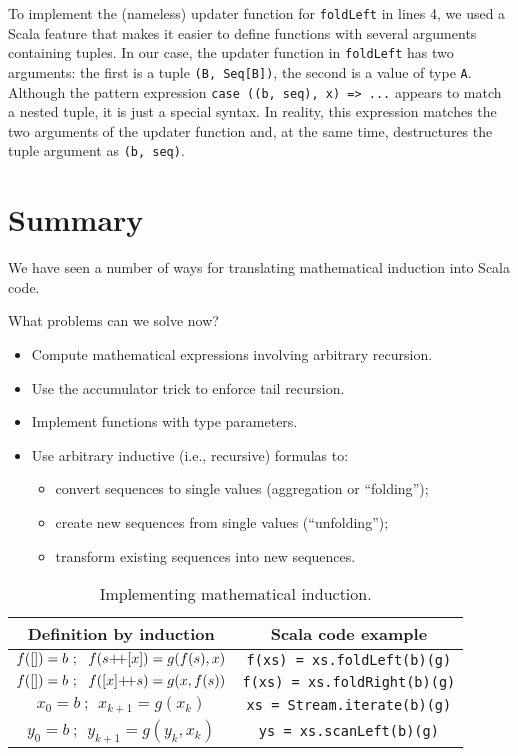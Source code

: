 \noindent To implement the (nameless) updater function for \lstinline!foldLeft!
in lines 4, we used a Scala feature that makes it easier
to define functions with several arguments containing tuples. In our
case, the updater function in \lstinline!foldLeft! has two arguments:
the first is a tuple \lstinline!(B, Seq[B])!, the second is a value
of type \lstinline!A!. Although the pattern expression \lstinline!case ((b, seq), x) => ...!
appears to match a nested tuple,
it is just a special syntax. In reality, this expression matches the
two arguments of the updater function and, at the same time, destructures
the tuple argument as \lstinline!(b, seq)!. 

\section{Summary}

We have seen a number of ways for translating mathematical induction
into Scala code.

What problems can we solve now?
\begin{itemize}
\item Compute mathematical expressions involving arbitrary recursion.
\item Use the accumulator trick to enforce tail recursion.
\item Implement functions with type parameters.
\item Use arbitrary inductive (i.e., recursive) formulas to:
\begin{itemize}
\item convert sequences to single values (aggregation or \textsf{``}folding\textsf{''});
\item create new sequences from single values (\textsf{``}unfolding\textsf{''});
\item transform existing sequences into new sequences.
\end{itemize}
\end{itemize}
\begin{wraptable}{l}{0.59\columnwidth}%
\begin{centering}
\vspace{-0.5\baselineskip}
\begin{tabular}{|c|c|}
\hline 
\textbf{\small{}Definition by induction} & \textbf{\small{}Scala code example}\tabularnewline
\hline 
\hline 
{\small{}$f(\left[\right])=b~;~~f(s{\displaystyle }{+\negmedspace+}[x])=g(f(s),x)$} & {\small{}}\lstinline!f(xs) = xs.foldLeft(b)(g)!\tabularnewline
\hline 
{\small{}$f(\left[\right])=b~;~~f([x]{\displaystyle }{+\negmedspace+} s)=g(x,f(s))$} & {\small{}}\lstinline!f(xs) = xs.foldRight(b)(g)!\tabularnewline
\hline 
{\small{}$x_{0}=b~;~~x_{k+1}=g(x_{k})$} & {\small{}}\lstinline!xs = Stream.iterate(b)(g)!\tabularnewline
\hline 
{\small{}$y_{0}=b~;~~y_{k+1}=g(y_{k},x_{k})$} & {\small{}}\lstinline!ys = xs.scanLeft(b)(g)!\tabularnewline
\hline 
\end{tabular}
\par\end{centering}
\caption{Implementing mathematical induction.\label{tab:Implementing-mathematical-induction}}
\vspace{-0.75\baselineskip}
\end{wraptable}%

